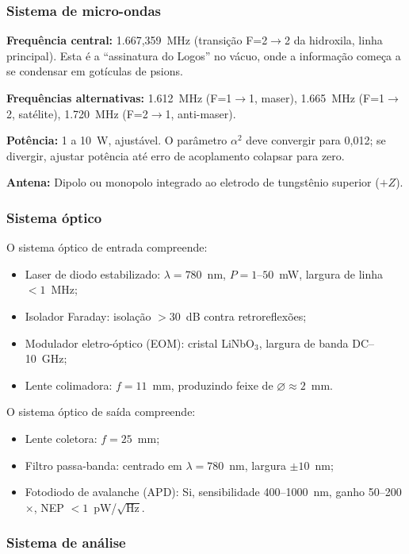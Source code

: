 \documentclass[12pt,a4paper]{article}
\newcommand{\alphaii}{\alpha^2}
\begin{document}
\subsubsection{Sistema de micro-ondas}

\textbf{Frequência central:} 1.667,359~MHz (transição F=2$\to$2
da hidroxila, linha principal). Esta é a ``assinatura do Logos''
no vácuo, onde a informação começa a se condensar em gotículas
de psions.

\textbf{Frequências alternativas:} 1.612~MHz (F=1$\to$1,
maser), 1.665~MHz (F=1$\to$2, satélite), 1.720~MHz
(F=2$\to$1, anti-maser).

\textbf{Potência:} 1 a 10~W, ajustável. O parâmetro $\alphaii$
deve convergir para 0,012; se divergir, ajustar potência até
erro de acoplamento colapsar para zero.

\textbf{Antena:} Dipolo ou monopolo integrado ao eletrodo de
tungstênio superior ($+Z$).

\subsubsection{Sistema óptico}

O sistema óptico de entrada compreende:
\begin{itemize}[nosep]
\item Laser de diodo estabilizado: $\lambda = 780$~nm,
  $P = 1$--$50$~mW, largura de linha $< 1$~MHz;
\item Isolador Faraday: isolação $> 30$~dB contra
  retroreflexões;
\item Modulador eletro-óptico (EOM): cristal LiNbO$_3$, largura
  de banda DC--10~GHz;
\item Lente colimadora: $f = 11$~mm, produzindo feixe de
  $\varnothing \approx 2$~mm.
\end{itemize}

O sistema óptico de saída compreende:
\begin{itemize}[nosep]
\item Lente coletora: $f = 25$~mm;
\item Filtro passa-banda: centrado em $\lambda = 780$~nm,
  largura $\pm 10$~nm;
\item Fotodiodo de avalanche (APD): Si, sensibilidade
  400--1000~nm, ganho 50--200$\times$,
  NEP $< 1$~pW/$\sqrt{\text{Hz}}$.
\end{itemize}

\subsubsection{Sistema de análise}
\end{document}
